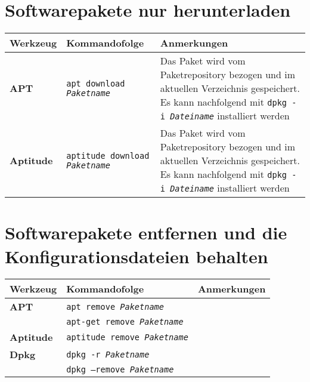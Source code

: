 \documentclass[10pt]{article}
\begin{document}
\section{Softwarepakete nur herunterladen}
\begin{tabular}{ p{3.5cm} p{9cm} p{11cm}}
  \hline
  \rowcolor{Gray}
  \textbf{Werkzeug} & \textbf{Kommandofolge} & \textbf{Anmerkungen} \\
  \hline 
  \textbf{APT} & \texttt{apt download \textit{Paketname}} & Das Paket wird vom Paketrepository bezogen und im aktuellen \newline Verzeichnis gespeichert. Es kann nachfolgend mit \texttt{dpkg -i \textit{Dateiname}} installiert werden\\
  \rowcolor{Gray}
  \textbf{Aptitude} & \texttt{aptitude download \textit{Paketname}} & Das Paket wird vom Paketrepository bezogen und im aktuellen \newline Verzeichnis gespeichert. Es kann nachfolgend mit \texttt{dpkg -i \textit{Dateiname}} installiert werden \\
  \hline
\end{tabular}

\section{Softwarepakete entfernen und die Konfigurationsdateien behalten}
\begin{tabular}{ p{3.5cm} p{9cm} p{11cm}}
  \hline
  \rowcolor{Gray}
  \textbf{Werkzeug} & \textbf{Kommandofolge} & \textbf{Anmerkungen} \\
  \hline 
  \textbf{APT} & \texttt{apt remove \textit{Paketname}} & \\
  \rowcolor{Gray}
  & \texttt{apt-get remove \textit{Paketname}} & \\
  \textbf{Aptitude} & \texttt{aptitude remove \textit{Paketname}} & \\
  \rowcolor{Gray}
  \textbf{Dpkg} & \texttt{dpkg -r \textit{Paketname}} & \\
  & \texttt{dpkg --remove \textit{Paketname}} & \\
  \hline
\end{tabular}
\end{document}
